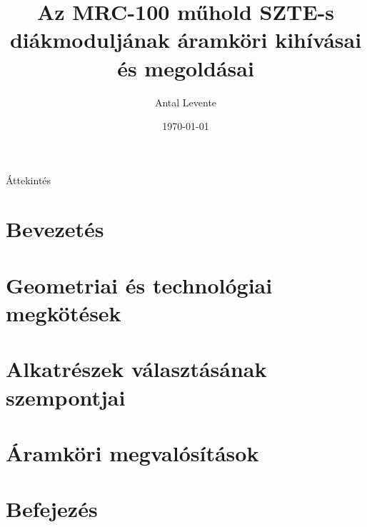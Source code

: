 \documentclass[aspectratio=169,xcolor=dvipsnames]{beamer}
\title[short title]{Az MRC-100 műhold SZTE-s diákmoduljának áramköri kihívásai és megoldásai} %
\subtitle{}
\author[Antal Levente] {Antal Levente}
\institute[NTU] %
{
    SZTE Móra Ferenc Szakkollégium \\
    Szegedi Tudományegyetem , BSc Villamosmérnöki
    \vskip 3pt
}
\date{\today} %
\begin{document}
\begin{frame}
    \titlepage
\end{frame}

\begin{frame}{Áttekintés}
    
    \tableofcontents
\end{frame}

\section{Bevezetés}
\section{Geometriai és technológiai megkötések}
\section{Alkatrészek választásának szempontjai}
\section{Áramköri megvalósítások}
\section{Befejezés}
\end{document}
